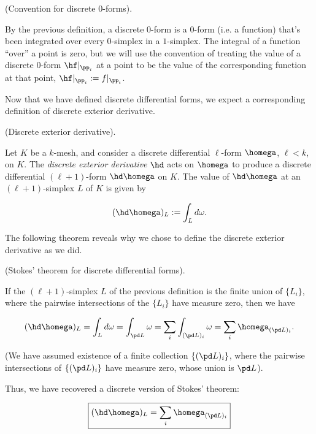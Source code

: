 \begin{defn}
    (Convention for discrete $0$-forms).
    
    By the previous definition, a discrete $0$-form is a $0$-form (i.e. a function) that's been integrated over every $0$-simplex in a $1$-simplex. The integral of a function ``over'' a point is zero, but we will use the convention of treating the value of a discrete $0$-form $\hf|_{\pp_i}$ at a point to be the value of the corresponding function at that point, $\hf|_{\pp_i} := f|_{\pp_i}$.
\end{defn}

Now that we have defined discrete differential forms, we expect a corresponding definition of discrete exterior derivative.

\begin{defn}
    (Discrete exterior derivative).
    
    Let $K$ be a $k$-mesh, and consider a discrete differential $\ell$-form $\homega$, $\ell < k$, on $K$.
    The \textit{discrete exterior derivative} $\hd$ acts on $\homega$ to produce a discrete differential $(\ell + 1)$-form $\hd \homega$ on $K$. The value of $\hd \homega$ at an $(\ell + 1)$-simplex $L$ of $K$ is given by
    
    \begin{align*}
        (\hd\homega)_L := \int_L d \omega.
    \end{align*}
\end{defn}

The following theorem reveals why we chose to define the discrete exterior derivative as we did.

\begin{theorem}
\label{ch::ddg::thm::discrete_stokes}
    (Stokes' theorem for discrete differential forms).
    
    If the $(\ell + 1)$-simplex $L$ of the previous definition is the finite union of $\{L_i\}$, where the pairwise intersections of the $\{L_i\}$ have measure zero, then we have
    
    \begin{align*}
        (\hd\homega)_L = \int_L d \omega = \int_{\pd L} \omega = \sum_i \int_{(\pd L)_i} \omega = \sum_i \homega_{(\pd L)_i}.
    \end{align*}
    
   (We have assumed existence of a finite collection $\{(\pd L)_i\}$, where the pairwise intersections of $\{(\pd L)_i\}$ have measure zero, whose union is $\pd L$).
    
    Thus, we have recovered a discrete version of Stokes' theorem:
    
    \begin{align*}
        \boxed
        {
            (\hd\homega)_L = \sum_i \homega_{(\pd L)_i}
        }
    \end{align*}
\end{theorem}

